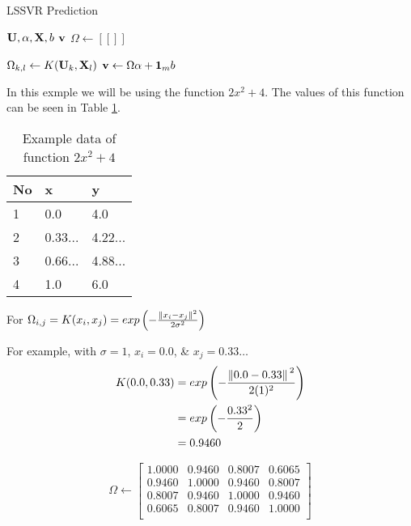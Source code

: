 \begin{algorithm}[H]
  \caption{LSSVR Prediction}\label{alg:lssvr_prediction}
  \begin{algorithmic}[1]
    \Require $\vb{U}, \vb{\alpha}, \vb{X}, b$
    \Ensure $\vb{v}$
    \State $\Omega \gets [[]]$ 

    \State$\Omega_{k,l}\gets K(\vb{U}_{k},\vb{X}_l)$
    \EndFor
    \EndFor
    \State $\vb{v} \gets \Omega\vb{\alpha} + \vb{1}_{m}b$
  \end{algorithmic}
\end{algorithm}

In this exmple we will be using the function $2x^2+4$. The values of this function can be seen in Table \ref{table:1}.

\begin{table}[H]
  \centering
  \begin{tabular}{@{}lll@{}}
    \toprule
    No & x       & y       \\ \midrule
    1  & 0.0     & 4.0     \\
    2  & 0.33... & 4.22... \\
    3  & 0.66... & 4.88... \\
    4  & 1.0     & 6.0     \\
    \bottomrule
  \end{tabular}
  \caption{Example data of function $2x^2+4$} \label{table:1}
\end{table}
For $\Omega_{i,j}=K(x_i,x_j)=exp \left(-\frac{\norm*{x_i-x_j}^2}{2\sigma^2}\right)$

For example, with $\sigma=1$, $x_i=0.0$, \& $x_j = 0.33\dots$
\begin{equation}
  \begin{split}
    K(0.0,0.33) & = exp\left(-\frac{\norm*{0.0-0.33}^2}{2(1)^2}\right) \\
    & = exp\left(-\frac{0.33^2}{2}\right) \\
    & = 0.9460
  \end{split}
\end{equation}

\begin{equation}
  \Omega\gets
  \begin{bmatrix}
    1.0000 & 0.9460 & 0.8007 & 0.6065 \\
    0.9460 & 1.0000 & 0.9460 & 0.8007 \\
    0.8007 & 0.9460 & 1.0000 & 0.9460 \\
    0.6065 & 0.8007 & 0.9460 & 1.0000 \\
  \end{bmatrix}
\end{equation}

